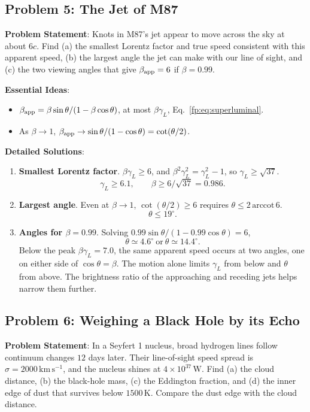 \subsection{Problem 5: The Jet of M87}
\label{fp:prob:m87}

\textbf{Problem Statement}: Knots in M87's jet appear to move across the sky at about $6c$. Find (a) the smallest Lorentz factor and true speed consistent with this apparent speed, (b) the largest angle the jet can make with our line of sight, and (c) the two viewing angles that give $\beta_{\rm app}=6$ if $\beta=0.99$.

\textbf{Essential Ideas}:
\begin{itemize}
	\item $\beta_{\rm app}=\beta\sin\theta/(1-\beta\cos\theta)$, at most $\beta\gamma_L$, Eq.~\eqref{fp:eq:superluminal}.
	\item As $\beta\to1$, $\beta_{\rm app}\to\sin\theta/(1-\cos\theta)=\cot(\theta/2)$.
\end{itemize}

\textbf{Detailed Solutions}:
\begin{enumerate}[label=(\alph*)]
	\item \textbf{Smallest Lorentz factor}. $\beta\gamma_L\ge6$, and $\beta^2\gamma_L^2=\gamma_L^2-1$, so $\gamma_L\ge\sqrt{37}$.
	\[
	\boxed{\gamma_L\ge6.1,\qquad \beta\ge6/\sqrt{37}=0.986.}
	\]
	\item \textbf{Largest angle}. Even at $\beta\to1$, $\cot(\theta/2)\ge6$ requires $\theta\le2\,\mathrm{arccot}\,6$.
	\[
	\boxed{\theta\le19^\circ.}
	\]
	\item \textbf{Angles for $\beta=0.99$}. Solving $0.99\sin\theta/(1-0.99\cos\theta)=6$,
	\[
	\boxed{\theta\simeq4.6^\circ\ \text{or}\ \theta\simeq14.4^\circ.}
	\]
	Below the peak $\beta\gamma_L=7.0$, the same apparent speed occurs at two angles, one on either side of $\cos\theta=\beta$. The motion alone limits $\gamma_L$ from below and $\theta$ from above. The brightness ratio of the approaching and receding jets helps narrow them further.
\end{enumerate}

\subsection{Problem 6: Weighing a Black Hole by its Echo}
\label{fp:prob:echo}

\textbf{Problem Statement}: In a Seyfert 1 nucleus, broad hydrogen lines follow continuum changes $12$ days later. Their line-of-sight speed spread is $\sigma=2000\,\mathrm{km\,s^{-1}}$, and the nucleus shines at $4\times10^{37}\,\mathrm W$. Find (a) the cloud distance, (b) the black-hole mass, (c) the Eddington fraction, and (d) the inner edge of dust that survives below $1500\,\mathrm K$. Compare the dust edge with the cloud distance.

